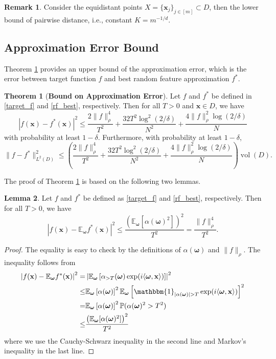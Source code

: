\documentclass[11pt,twoside]{article}
\theoremstyle{plain}
\theoremstyle{definition}
\newtheorem{lemma}{Lemma}[section]
\newtheorem{theorem}[lemma]{Theorem}
\newtheorem{remark}{Remark}
\theoremstyle{remark}
\newcommand{\E}{\mathbb{E}}
\newcommand{\Pbb}{\mathbb{P}}
\newcommand{\xb}{\mathbf{x}}
\newcommand{\vol}{\mathop{\mathrm{vol}}}
\newcommand{\indicator}{\mathbbm{1}}
\newcommand{\omegab}{\boldsymbol\omega}
\begin{document}
\begin{remark}
Consider the equidistant points $X = \{\xb_j\}_{j\in[m]} \subset D$, then the lower bound of pairwise distance, i.e., constant $K=m^{-1/d}$. 
\end{remark}

\subsection{Approximation Error Bound}
Theorem \ref{rf_term1} provides an upper bound of the approximation error, which is the error between target function $f$ and best random feature approximation $f^*$.
\begin{theorem}[{\bf Bound on Approximation Error}]
\label{rf_term1}
Let $f$ and $f^*$ be defined in \eqref{target_f} and \eqref{rf_best}, respectively. Then for all $T>0$ and $\xb\in D$, we have
\begin{equation}
|f(\xb) - f^*(\xb)|^2 \leq \frac{2\|f\|_\rho^4}{T^2} + \frac{32T^2\log^2(2/\delta)}{N^2} + \frac{4\|f\|^2_\rho\log(2/\delta)}{N} 
\end{equation}
with probability at least $1-\delta$. 
Furthermore, with probability at least $1-\delta$,
\begin{equation}
\label{first_term}
\| f - f^* \|_{L^2(D)}^2 \leq \left( \frac{2\|f\|_\rho^4}{T^2} + \frac{32T^2\log^2(2/\delta)}{N^2} + \frac{4\|f\|^2_\rho\log(2/\delta)}{N} \right) \vol(D). 
\end{equation}
\end{theorem}

The proof of Theorem \ref{rf_term1} is based on the following two lemmas.
   
\begin{lemma}
\label{term1_lem1}
Let $f$ and $f^*$ be defined as \eqref{target_f} and \eqref{rf_best}, respectively. Then for all $T>0$, we have
\begin{equation}
\left| f(\xb) - \E_{\omegab} f^*(\xb) \right|^2 \leq \frac{\left(\E_{\omegab}[\alpha(\omegab)^2]\right)^2}{T^2} = \frac{\|f\|_{\rho}^4}{T^2}.
\end{equation}
\end{lemma}
\begin{proof}
The equality is easy to check by the definitions of $\alpha(\omegab)$ and $\|f\|_\rho$.
The inequality follows from
\begin{equation}
\begin{aligned}
\left| f(\xb) - \E_{\omegab} f^*(\xb) \right|^2 =& \left| \E_{\omegab} \left[ \alpha_{>T}(\omegab)\exp(i\langle \omegab,\xb\rangle) \right] \right|^2 \\
\leq& \E_{\omegab} \left[\alpha(\omegab)\right]^2 \E_{\omegab} \left[ \indicator_{\left|\alpha(\omegab)\right|> T}\exp(i\langle \omegab,\xb\rangle)\right]^2  \\
=& \E_{\omegab} \left[\alpha(\omegab)\right]^2 \Pbb(\alpha(\omegab)^2>T^2) \\
\leq& \frac{\left(\E_{\omegab}[\alpha(\omegab)^2]\right)^2}{T^2}
\end{aligned}
\end{equation}
where we use the Cauchy-Schwarz inequality in the second line and Markov's inequality in the last line. 
\end{proof}
\end{document}
